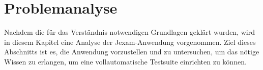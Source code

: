 \chapter{Problemanalyse}\label{ch:problemanalyse}


Nachdem die f\"ur das Verständnis notwendigen Grundlagen gekl\"art wurden,
wird in diesem Kapitel eine Analyse der Jexam-Anwendung vorgenommen.
Ziel dieses Abschnitts ist es, die Anwendung vorzustellen und zu untersuchen,
um das n\"otige Wissen zu erlangen, um eine vollautomatische Testsuite
einrichten zu können.


